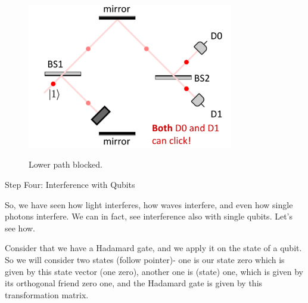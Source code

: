 \begin{figure}[H]
   \centering
    \includegraphics[width=0.8\textwidth]{lesson6/bottom_blocked.pdf}
    \label{fig: 1}
    
        \caption{Lower path blocked.}
    
\end{figure}

Step Four: Interference with Qubits

So, we have seen how light interferes, how waves interfere, and even how single photons interfere. We can in fact, see interference also with single qubits. Let's see how.

Consider that we have a Hadamard gate, and we apply it on the state of a qubit. So we will consider two states (follow pointer)- one is our state zero which is given by this state vector (one zero), another one is (state) one, which is given by its orthogonal friend zero one, and the Hadamard gate is given by this transformation matrix.

